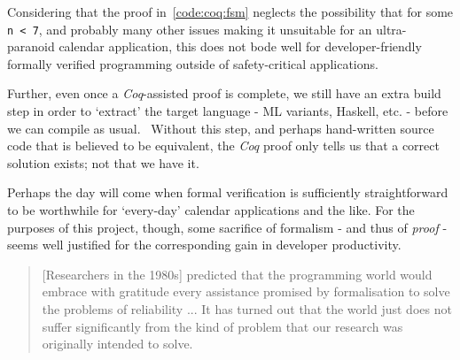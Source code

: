 Considering that the proof in~\cref{code:coq:fsm} neglects the possibility that  for some \texttt{n < 7}, and probably many other issues making it unsuitable for an ultra-paranoid calendar application, this does not bode well for developer-friendly formally verified programming outside of safety-critical applications.

Further, even once a \emph{Coq}-assisted proof is complete, we still have an extra build step in order to `extract' the target language - ML variants, Haskell, etc. - before we can compile as usual.~\cite{coq_extraction} Without this step, and perhaps hand-written source code that is believed to be equivalent, the \emph{Coq} proof only tells us that a correct solution exists; not that we have it.

Perhaps the day will come when formal verification is sufficiently straightforward to be worthwhile for `every-day' calendar applications and the like. For the purposes of this project, though, some sacrifice of formalism - and thus of \emph{proof} - seems well justified for the corresponding gain in developer productivity.

\begin{quote}
[Researchers in the 1980s] predicted that the programming world would embrace with gratitude every assistance promised by formalisation to solve the problems of reliability ... It has turned out that the world just does not suffer significantly from the kind of problem that our research was originally intended to solve. \cite{hoare_quote}
\end{quote}